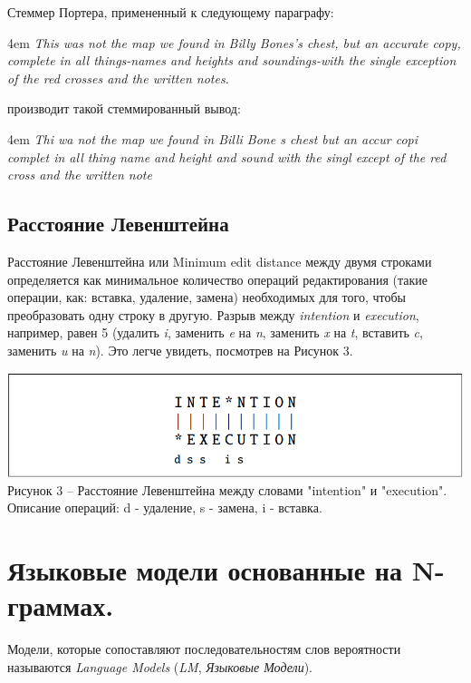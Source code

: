 \documentclass[a4paper,12pt,preview]{report} %
\begin{document}
	Стеммер Портера, примененный к следующему параграфу:
	
	\vspace{5mm}
	\begingroup
	\leftskip4em
	\rightskip\leftskip\textit{	This was not the map we found in Billy Bones's chest, but an accurate copy, complete in all things-names and heights and soundings-with the single exception of the red crosses and the written notes.}
	\vspace{5mm}
	\endgroup
	
	производит такой стеммированный вывод:
	
	\vspace{5mm}
	\begingroup
	\leftskip4em
	\rightskip\leftskip\textit{Thi wa not the map we found in Billi Bone s chest but an accur copi complet in all thing name and height and sound with the singl except of the red cross and the written note}
	\vspace{5mm}
	\endgroup
	
	
	\subsection{Расстояние Левенштейна}
	
	Расстояние Левенштейна \cite{7} или Minimum edit distance между двумя строками определяется как минимальное количество операций редактирования (такие операции, как: вставка, удаление,
	замена) необходимых для того, чтобы преобразовать одну строку в другую.
	Разрыв между \textit{intention} и \textit{execution}, например, равен 5 (удалить \textit{i}, заменить \textit{e} на \textit{n}, заменить \textit{x} на \textit{t}, вставить \textit{c}, заменить \textit{u} на \textit{n}). Это легче увидеть, посмотрев на Рисунок 3.
	
	
	\begin{center}
		\includegraphics[scale=0.8]{MED.PNG}
		\\ Рисунок 3 -- Расстояние Левенштейна между словами "intention" и "execution". \\ Описание операций: d - удаление, s - замена, i - вставка.
	\end{center}
	
	\section{Языковые модели основанные на N-граммах.}
	Модели, которые сопоставляют последовательностям слов вероятности называются \textit{Language Models} (\textit{LM}, \textit{Языковые Модели}).
	
\end{document}
